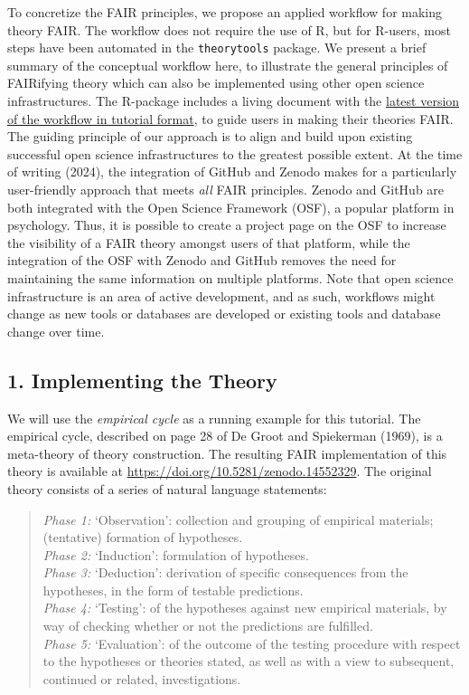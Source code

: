 \documentclass[
  man, noextraspace,floatsintext]{apa7}
\begin{document}
To concretize the FAIR principles,
we propose an applied workflow for making theory FAIR.
The workflow does not require the use of R,
but for R-users, most steps have been automated in the \texttt{theorytools} package.
We present a brief summary of the conceptual workflow here,
to illustrate the general principles of FAIRifying theory which can also be implemented using other open science infrastructures.
The R-package includes a living document with the \href{https://cjvanlissa.github.io/theorytools/articles/fair-theory.html}{latest version of the workflow in tutorial format},
to guide users in making their theories FAIR.
The guiding principle of our approach is to align and build upon existing successful open science infrastructures to the greatest possible extent.
At the time of writing (2024),
the integration of GitHub and Zenodo makes for a particularly user-friendly approach that meets \emph{all} FAIR principles.
Zenodo and GitHub are both integrated with the Open Science Framework (OSF),
a popular platform in psychology.
Thus, it is possible to create a project page on the OSF to increase the visibility of a FAIR theory amongst users of that platform,
while the integration of the OSF with Zenodo and GitHub removes the need for maintaining the same information on multiple platforms.
Note that open science infrastructure is an area of active development, and as such,
workflows might change as new tools or databases are developed or existing tools and database change over time.

\subsection{1. Implementing the Theory}\label{implementing-the-theory}

We will use the \emph{empirical cycle} as a running example for this tutorial.
The empirical cycle, described on page 28 of De Groot and Spiekerman (1969),
is a meta-theory of theory construction.
The resulting FAIR implementation of this theory is available at \url{https://doi.org/10.5281/zenodo.14552329}.
The original theory consists of a series of natural language statements:

\begin{quote}
\emph{Phase 1:} `Observation': collection and grouping of empirical materials; (tentative) formation of hypotheses.\\
\emph{Phase 2:} `Induction': formulation of hypotheses.\\
\emph{Phase 3:} `Deduction': derivation of specific consequences from the hypotheses, in the form of testable predictions.\\
\emph{Phase 4:} `Testing': of the hypotheses against new empirical materials, by way of checking whether or not the predictions are fulfilled.\\
\emph{Phase 5:} `Evaluation': of the outcome of the testing procedure with respect to the hypotheses or theories stated, as well as with a view to subsequent, continued or related, investigations.
\end{quote}
\end{document}
